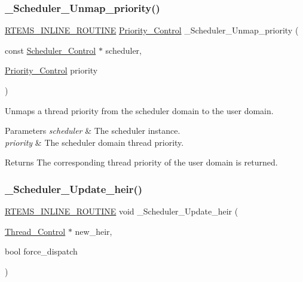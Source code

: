 \subsubsection{\texorpdfstring{\_Scheduler\_Unmap\_priority()}{\_Scheduler\_Unmap\_priority()}}
{\footnotesize\ttfamily \mbox{\hyperlink{group__RTEMSScoreBaseDefs_gac216239df231d5dbd15e3520b0b9313f}{R\+T\+E\+M\+S\+\_\+\+I\+N\+L\+I\+N\+E\+\_\+\+R\+O\+U\+T\+I\+NE}} \mbox{\hyperlink{group__RTEMSScorePriority_ga59d02b58072d31a9a1cfe644557aefe2}{Priority\+\_\+\+Control}} \+\_\+\+Scheduler\+\_\+\+Unmap\+\_\+priority (\begin{DoxyParamCaption}\item[{const \mbox{\hyperlink{struct__Scheduler__Control}{Scheduler\+\_\+\+Control}} $\ast$}]{scheduler,  }\item[{\mbox{\hyperlink{group__RTEMSScorePriority_ga59d02b58072d31a9a1cfe644557aefe2}{Priority\+\_\+\+Control}}}]{priority }\end{DoxyParamCaption})}



Unmaps a thread priority from the scheduler domain to the user domain. 


\begin{DoxyParams}{Parameters}
{\em scheduler} & The scheduler instance. \\
\hline
{\em priority} & The scheduler domain thread priority.\\
\hline
\end{DoxyParams}
\begin{DoxyReturn}{Returns}
The corresponding thread priority of the user domain is returned. 
\end{DoxyReturn}
\mbox{\label{group__RTEMSScoreScheduler_ga29bb7f28ab22ddb95869cc527f2f75bf}} 
\subsubsection{\texorpdfstring{\_Scheduler\_Update\_heir()}{\_Scheduler\_Update\_heir()}}
{\footnotesize\ttfamily \mbox{\hyperlink{group__RTEMSScoreBaseDefs_gac216239df231d5dbd15e3520b0b9313f}{R\+T\+E\+M\+S\+\_\+\+I\+N\+L\+I\+N\+E\+\_\+\+R\+O\+U\+T\+I\+NE}} void \+\_\+\+Scheduler\+\_\+\+Update\+\_\+heir (\begin{DoxyParamCaption}\item[{\mbox{\hyperlink{struct__Thread__Control}{Thread\+\_\+\+Control}} $\ast$}]{new\+\_\+heir,  }\item[{bool}]{force\+\_\+dispatch }\end{DoxyParamCaption})}



